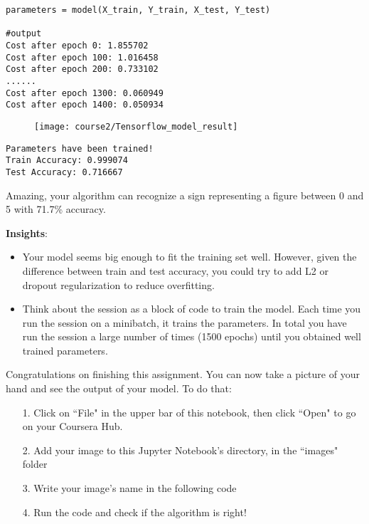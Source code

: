 \begin{verbatim}
parameters = model(X_train, Y_train, X_test, Y_test)

#output
Cost after epoch 0: 1.855702
Cost after epoch 100: 1.016458
Cost after epoch 200: 0.733102
......
Cost after epoch 1300: 0.060949
Cost after epoch 1400: 0.050934
\end{verbatim}

\begin{figure}[h]
\begin{center}
\texttt{[image: course2/Tensorflow\_model\_result]}
\end{center}
\end{figure}
\begin{verbatim}
Parameters have been trained!
Train Accuracy: 0.999074
Test Accuracy: 0.716667
\end{verbatim}

Amazing, your algorithm can recognize a sign representing a figure between 0 and 5 with 71.7\% accuracy.

{\textbf {Insights}}:
\begin{itemize}
\item Your model seems big enough to fit the training set well. However, given the difference between train and test accuracy, you could try to add L2 or dropout regularization to reduce overfitting.
\item Think about the session as a block of code to train the model. Each time you run the session on a minibatch, it trains the parameters. In total you have run the session a large number of times (1500 epochs) until you obtained well trained parameters.
\end{itemize}





Congratulations on finishing this assignment. You can now take a picture of your hand and see the output of your model. To do that:
\begin{itemize}
\item[1.] Click on ``File" in the upper bar of this notebook, then click ``Open" to go on your Coursera Hub.
\item[2.] Add your image to this Jupyter Notebook's directory, in the ``images" folder
\item[3.] Write your image's name in the following code
\item[4.] Run the code and check if the algorithm is right!
\end{itemize}


